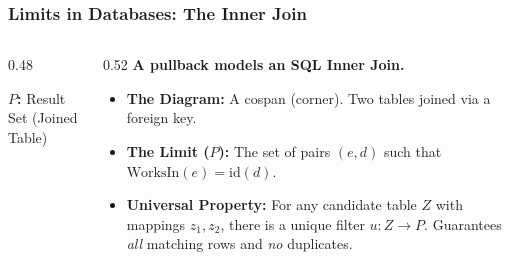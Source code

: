 \documentclass[11pt,t,usepdftitle=false,aspectratio=169]{beamer}
\begin{document}
\begin{frame}[fragile]
\frametitle{Limits in Databases: The Inner Join}

  \begin{columns}[T]
    \begin{column}{0.48\textwidth}
      \centering
      
      \vspace{0.3cm}
      {\footnotesize \textbf{$P$:} Result Set (Joined Table)}
      
    \end{column}
    \begin{column}{0.52\textwidth}
      \textbf{A pullback models an SQL Inner Join.}
      
      \medskip
      \begin{itemize}
        \item<3-> \textbf{The Diagram:} A cospan (corner). Two tables joined via a foreign key.
        \item<4-> \textbf{The Limit ($P$):} The set of pairs $(e, d)$ such that $\text{WorksIn}(e) = \text{id}(d)$.
        \item<5-> \textbf{Universal Property:} For any candidate table $Z$ with mappings $z_1, z_2$, there is a unique filter $u: Z \to P$. Guarantees \textit{all} matching rows and \textit{no} duplicates. 
      \end{itemize}
      
      \vspace{0.3cm}
    \end{column}
  \end{columns}
\end{frame}
\end{document}
